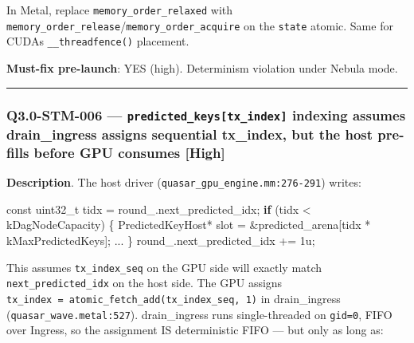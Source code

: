 \documentclass[
]{article}
\newenvironment{Shaded}{}{}
\newcommand{\AttributeTok}[1]{\textcolor[rgb]{0.49,0.56,0.16}{#1}}
\newcommand{\BuiltInTok}[1]{\textcolor[rgb]{0.00,0.50,0.00}{#1}}
\newcommand{\ControlFlowTok}[1]{\textcolor[rgb]{0.00,0.44,0.13}{\textbf{#1}}}
\newcommand{\DataTypeTok}[1]{\textcolor[rgb]{0.56,0.13,0.00}{#1}}
\newcommand{\DecValTok}[1]{\textcolor[rgb]{0.25,0.63,0.44}{#1}}
\newcommand{\NormalTok}[1]{#1}
\newcommand{\OperatorTok}[1]{\textcolor[rgb]{0.40,0.40,0.40}{#1}}
\newcommand{\VariableTok}[1]{\textcolor[rgb]{0.10,0.09,0.49}{#1}}
\begin{document}
In Metal, replace \texttt{memory\_order\_relaxed} with
\texttt{memory\_order\_release}/\texttt{memory\_order\_acquire} on the
\texttt{state} atomic. Same for CUDA\textquotesingle s
\texttt{\_\_threadfence()} placement.

\textbf{Must-fix pre-launch}: YES (high). Determinism violation under
Nebula mode.

\begin{center}\rule{0.5\linewidth}{0.5pt}\end{center}

\subsubsection{\texorpdfstring{Q3.0-STM-006 ---
\texttt{predicted\_keys{[}tx\_index{]}} indexing assumes drain\_ingress
assigns sequential tx\_index, but the host pre-fills before GPU consumes
{[}High{]}}{Q3.0-STM-006 --- predicted\_keys{[}tx\_index{]} indexing assumes drain\_ingress assigns sequential tx\_index, but the host pre-fills before GPU consumes {[}High{]}}}\label{q30-stm-006--predicted_keystx_index-indexing-assumes-drain_ingress-assigns-sequential-tx_index-but-the-host-pre-fills-before-gpu-consumes-high}

\textbf{Description}. The host driver
(\texttt{quasar\_gpu\_engine.mm:276-291}) writes:

\begin{Shaded}
\begin{Highlighting}[]
\AttributeTok{const} \DataTypeTok{uint32\_t}\NormalTok{ tidx }\OperatorTok{=} \VariableTok{round\_}\OperatorTok{.}\NormalTok{next\_predicted\_idx}\OperatorTok{;}
\ControlFlowTok{if} \OperatorTok{(}\NormalTok{tidx }\OperatorTok{\textless{}}\NormalTok{ kDagNodeCapacity}\OperatorTok{)} \OperatorTok{\{}
\NormalTok{    PredictedKeyHost}\OperatorTok{*}\NormalTok{ slot }\OperatorTok{=} \OperatorTok{\&}\NormalTok{predicted\_arena}\OperatorTok{[}\NormalTok{tidx }\OperatorTok{*}\NormalTok{ kMaxPredictedKeys}\OperatorTok{];}
    \OperatorTok{...}
\OperatorTok{\}}
\VariableTok{round\_}\OperatorTok{.}\NormalTok{next\_predicted\_idx }\OperatorTok{+=} \DecValTok{1}\BuiltInTok{u}\OperatorTok{;}
\end{Highlighting}
\end{Shaded}

This assumes \texttt{tx\_index\_seq} on the GPU side will exactly match
\texttt{next\_predicted\_idx} on the host side. The GPU assigns
\texttt{tx\_index\ =\ atomic\_fetch\_add(tx\_index\_seq,\ 1)} in
drain\_ingress (\texttt{quasar\_wave.metal:527}). drain\_ingress runs
single-threaded on \texttt{gid=0}, FIFO over Ingress, so the assignment
IS deterministic FIFO --- but only as long as:
\end{document}
